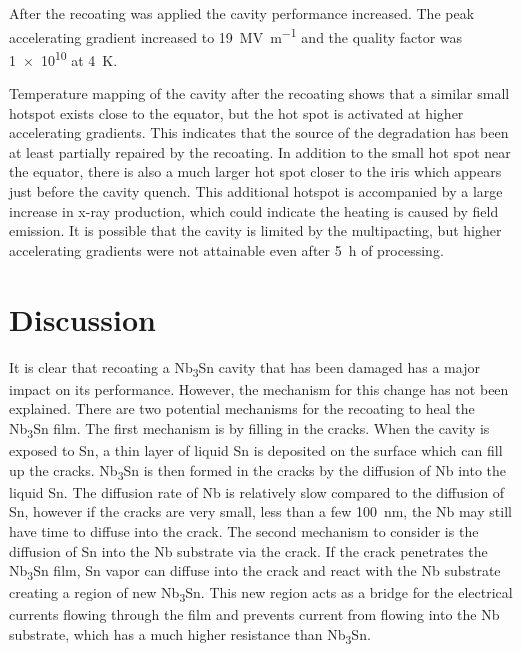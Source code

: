 \documentclass{revtex4-2}
\begin{document}
After the recoating was applied the cavity performance increased. The peak accelerating gradient increased to \qty{19}{\mega\volt\per\meter} and the quality factor was \num{1e10} at \qty{4}{\kelvin}.

Temperature mapping of the cavity after the recoating shows that a similar small hotspot exists close to the equator, but the hot spot is activated at higher accelerating gradients. This indicates that the source of the degradation has been at least partially repaired by the recoating. In addition to the small hot spot near the equator, there is also a much larger hot spot closer to the iris which appears just before the cavity quench. This additional hotspot is accompanied by a large increase in x-ray production, which could indicate the heating is caused by field emission. It is possible that the cavity is limited by the multipacting, but higher accelerating gradients were not attainable even after \qty{5}{\hour} of processing.



\section*{Discussion}
\label{sec:Discussion}

It is clear that recoating a Nb\textsubscript{3}Sn cavity that has been damaged has a major impact on its performance. However, the mechanism for this change has not been explained. There are two potential mechanisms for the recoating to heal the Nb\textsubscript{3}Sn film. The first mechanism is by filling in the cracks. When the cavity is exposed to Sn, a thin layer of liquid Sn is deposited on the surface which can fill up the cracks. Nb\textsubscript{3}Sn is then formed in the cracks by the diffusion of Nb into the liquid Sn. The diffusion rate of Nb is relatively slow compared to the diffusion of Sn, however if the cracks are very small, less than a few \qty{100}{nm}, the Nb may still have time to diffuse into the crack. The second mechanism to consider is the diffusion of Sn into the Nb substrate via the crack. If the crack penetrates the Nb\textsubscript{3}Sn film, Sn vapor can diffuse into the crack and react with the Nb substrate creating a region of new Nb\textsubscript{3}Sn. This new region acts as a bridge for the electrical currents flowing through the film and prevents current from flowing into the Nb substrate, which has a much higher resistance than Nb\textsubscript{3}Sn. 
\end{document}
